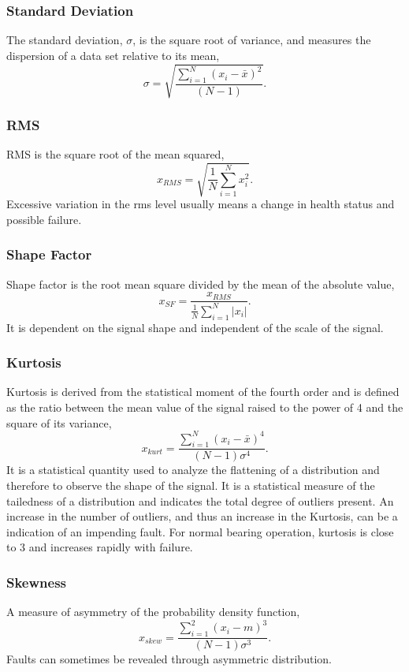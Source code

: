 \documentclass[]{article}
\begin{document}
\subsubsection*{Standard Deviation}  
The standard deviation, $\sigma$, is the square root of variance, and measures the dispersion of a data set relative to its mean,
\begin{equation}
	\sigma = \sqrt{\frac{\sum^N_{i=1}(x_i-\bar{x})^2}{(N-1)}}.
\end{equation}
\subsubsection*{\gls{RMS}}
\gls{RMS} is the square root of the mean squared,
\begin{equation}
x_{RMS} = \sqrt{\frac{1}{N} \sum^N_{i=1}x^2_i}.
\end{equation}
Excessive variation in the rms level usually means a change in health status and possible failure. 
\subsubsection*{Shape Factor}
Shape factor is the root mean square divided by the mean of the absolute value,
\begin{equation}
x_{SF} = \frac{ x_{RMS} }  {\frac{1}{N}\sum^N_{i=1}|x_i|}.
\end{equation}
It is dependent on the signal shape and independent of the scale of the signal.
\subsubsection*{Kurtosis}
Kurtosis is derived from the statistical moment of the fourth order and is defined as the ratio between the mean value of the signal raised to the power of 4 and the square of its variance, \begin{equation}
x_{kurt} = \frac{\sum^N_{i=1}(x_i-\bar{x})^4}{(N-1)\sigma^4}.
\end{equation}
It is a statistical quantity used to analyze the flattening of a distribution and therefore to observe the shape of the signal. It is a statistical measure of the tailedness of a distribution and indicates the total degree of outliers present. An increase in the number of outliers, and thus an increase in the Kurtosis, can be a indication of an impending fault. For normal bearing operation, kurtosis is close to 3 and increases rapidly with failure.
\subsubsection*{Skewness} 
A measure of asymmetry of the probability density function,
\begin{equation}
x_{skew} = \frac{\sum^2_{i=1}(x_i-m)^3}{(N-1)\sigma^3}.
\end{equation}
Faults can sometimes be revealed through asymmetric distribution.
\end{document}
